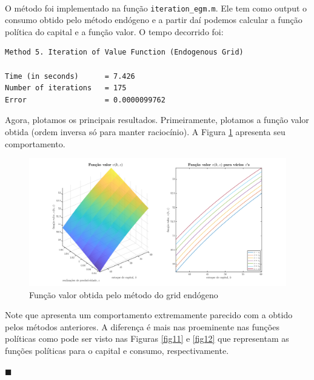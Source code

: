 \documentclass[10pt]{article}
\newcommand*{\QEDA}{\hfill\ensuremath{\blacksquare}}%
\newcommand\0{\mathbf{0}}
\newenvironment{sol}
    {\\[1em] {\color{magenta}\text{Resposta.}}
    }
    {{\color{blue!50!black}\QEDA}}
\begin{document}
\begin{enumerate}[wide]
\begin{sol}
O método foi implementado na função \texttt{iteration\_egm.m}. Ele tem como output o consumo obtido pelo método endógeno e a partir daí podemos calcular a função política do capital e a função valor. O tempo decorrido foi: 

\begin{lstlisting}
Method 5. Iteration of Value Function (Endogenous Grid) 

Time (in seconds)      = 7.426 
Number of iterations   = 175 
Error                  = 0.0000099762 
\end{lstlisting}

\newpage

Agora, plotamos os principais resultados. Primeiramente, plotamos a função valor obtida (ordem inversa só para manter raciocínio). A Figura \ref{fig10} apresenta seu comportamento. 

\begin{figure}[htp!]
\centering
\includegraphics[scale=0.28]{value_function_egm.png}
\caption{Função valor obtida pelo método do grid endógeno}
\label{fig10}
\end{figure}
Note que apresenta um comportamento extremamente parecido com a obtido pelos métodos anteriores. A diferença é mais nas proeminente nas funções políticas como pode ser visto nas Figuras \ref{fig11} e \ref{fig12} que representam as funções políticas para o capital e consumo, respectivamente.


\end{sol}
\end{enumerate}
\end{document}

